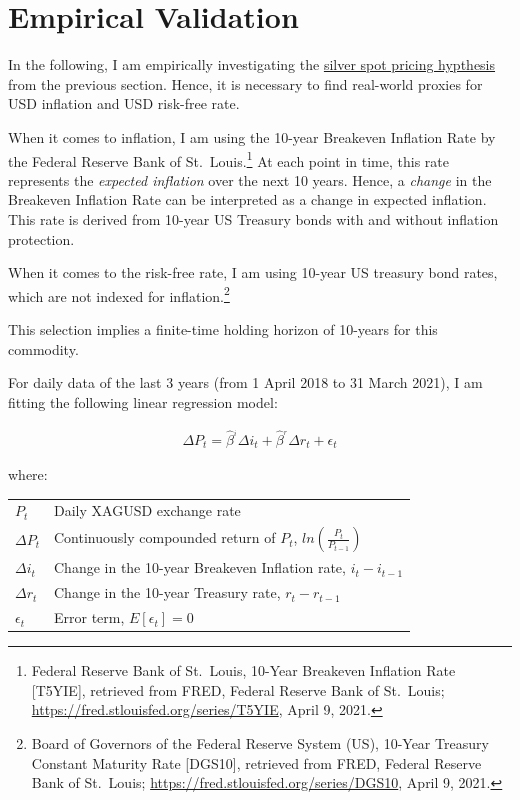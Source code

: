 \documentclass[
  12pt,
]{article}
\begin{document}
\hypertarget{empirical-validation}{%
\section{Empirical Validation}\label{empirical-validation}}

In the following, I am empirically investigating the
\protect\hyperlink{silver-spot-pricing-hypothesis}{silver spot pricing
hypthesis} from the previous section. Hence, it is necessary to find
real-world proxies for USD inflation and USD risk-free rate.

When it comes to inflation, I am using the 10-year Breakeven Inflation
Rate by the Federal Reserve Bank of St.~Louis.\footnote{Federal Reserve
  Bank of St.~Louis, 10-Year Breakeven Inflation Rate {[}T5YIE{]},
  retrieved from FRED, Federal Reserve Bank of St.~Louis;
  \url{https://fred.stlouisfed.org/series/T5YIE}, April 9, 2021.} At
each point in time, this rate represents the \emph{expected inflation}
over the next 10 years. Hence, a \emph{change} in the Breakeven
Inflation Rate can be interpreted as a change in expected inflation.
This rate is derived from 10-year US Treasury bonds with and without
inflation protection.

When it comes to the risk-free rate, I am using 10-year US treasury bond
rates, which are not indexed for inflation.\footnote{Board of Governors
  of the Federal Reserve System (US), 10-Year Treasury Constant Maturity
  Rate {[}DGS10{]}, retrieved from FRED, Federal Reserve Bank of
  St.~Louis; \url{https://fred.stlouisfed.org/series/DGS10}, April 9,
  2021.}

This selection implies a finite-time holding horizon of 10-years for
this commodity.

For daily data of the last 3 years (from 1 April 2018 to 31 March 2021),
I am fitting the following linear regression model:

\begin{align}
\Delta P_t = \hat\beta^{_i} \Delta i_t + \hat\beta^{_r} \Delta r_t + \epsilon_t
\end{align}

\begin{footnotesize}
where:

\begin{tabular}{ll}

$P_t$ & Daily XAGUSD exchange rate\\
$\Delta P_t$ & Continuously compounded return of $\scriptstyle P_t$, $\scriptstyle ln \left( \frac{P_t}{P_{t-1}} \right)$\\
$\Delta i_t$ & Change in the 10-year Breakeven Inflation rate, $\scriptstyle i_t - i_{t-1}$\\
$\Delta r_t$ & Change in the 10-year Treasury rate, $\scriptstyle r_t - r_{t-1}$\\
$\epsilon_t$ & Error term, $E[\epsilon_t] = 0$\\

\end{tabular}
\end{footnotesize}
\end{document}
